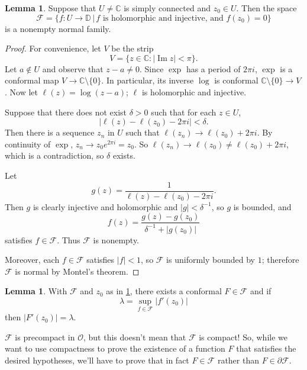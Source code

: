 \documentclass[12pt]{report}
\newcommand{\CC}{\mathbb{C}}
\newcommand{\DD}{\mathbb{D}}
\newcommand{\FF}{\mathcal{F}}
\newcommand{\OO}{\mathcal{O}}
\renewcommand{\Im}{\operatorname{Im}}
\theoremstyle{definition}
\newtheorem{lemma}[theorem]{Lemma}
\begin{document}
\begin{lemma}
\label{riem 1}
Suppose that $U \neq \CC$ is simply connected and $z_0 \in U$. Then the space
$$\FF = \{f: U \to \DD \, | \, f \text{ is holomorphic and injective, and } f(z_0) = 0\}$$
is a nonempty normal family.
\begin{proof}
For convenience, let $V$ be the strip
$$V = \{z \in \CC: |\Im z| < \pi\}.$$
Let $a \notin U$ and observe that $z - a \neq 0$. Since $\exp$ has a period of $2\pi i$, $\exp$ is a conformal map $V \to \CC \setminus \{0\}$. In particular, its inverse $\log$ is conformal $\CC \setminus \{0\} \to V$. Now let $\ell(z) = \log(z - a)$; $\ell$ is holomorphic and injective.

Suppose that there does not exist $\delta > 0$ such that for each $z \in U$,
$$|\ell(z) - \ell(z_0) - 2\pi i| < \delta.$$
Then there is a sequence $z_n$ in $U$ such that $\ell(z_n) \to \ell(z_0) + 2\pi i$. By continuity of $\exp$, $z_n \to z_0 e^{2\pi i} = z_0$. So $\ell(z_n) \to \ell(z_0) \neq \ell(z_0) + 2\pi i$, which is a contradiction, so $\delta$ exists.

Let
$$g(z) = \frac{1}{\ell(z) - \ell(z_0) - 2\pi i}.$$
Then $g$ is clearly injective and holomorphic and $|g| < \delta^{-1}$, so $g$ is bounded, and
$$f(z) = \frac{g(z) - g(z_0)}{\delta^{-1} + |g(z_0)|}$$
satisfies $f \in \FF$. Thus $\FF$ is nonempty.

Moreover, each $f \in \FF$ satisfies $|f| < 1$, so $\FF$ is uniformly bounded by $1$; therefore $\FF$ is normal by Montel's theorem.
\end{proof}
\end{lemma}

\begin{lemma}
\label{riem 2}
With $\FF$ and $z_0$ as in \ref{riem 1}, there exists a conformal $F \in \FF$ and if
$$\lambda = \sup_{f \in \FF} |f'(z_0)|$$
then $|F'(z_0)| = \lambda$.
\end{lemma}

$\FF$ is precompact in $\OO$, but this doesn't mean that $\FF$ is compact! So, while we want to use compactness to prove the existence of a function $F$ that satisfies the desired hypotheses, we'll have to prove that in fact $F \in \FF$ rather than $F \in \partial \FF$.
\end{document}
